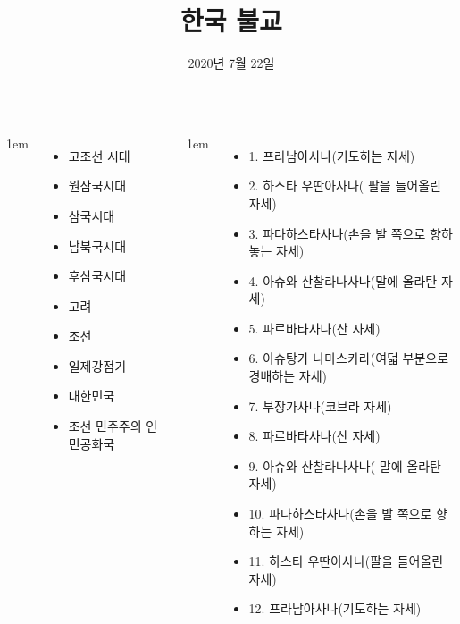 \documentclass[25pt, a1paper ]{tikzposter}
\title{ 한국 불교 }
\author{ 2020년 7월  
				22일 }
\begin{document}
	\maketitle



	\begin{columns}


			{
					\setlength{\leftmargini}{2em}
					\setlength{\labelsep} {1em}
					\begin{itemize}
					\item 고조선 시대
					\item 원삼국시대
					\item 삼국시대
					\item 남북국시대
					\item 후삼국시대
					\item 고려
					\item 조선

					\item 일제강점기

					\item 대한민국
					\item 조선 민주주의 인민공화국
					\end{itemize}
			}


			{
					\setlength{\leftmargini}{2em}
					\setlength{\labelsep} {1em}
					\begin{itemize}
					\item 1. 프라남아사나(기도하는 자세) 
					\item 2. 하스타 우딴아사나( 팔을 들어올린 자세)
					\item 3. 파다하스타사나(손을 발 쪽으로 향하놓는 자세)
					\item 4. 아슈와 산찰라나사나(말에 올라탄 자세)
					\item 5. 파르바타사나(산 자세)
					\item 6. 아슈탕가 나마스카라(여덟 부분으로 경배하는 자세)
					\item 7. 부장가사나(코브라 자세)
					\item 8. 파르바타사나(산 자세)
					\item 9. 아슈와 산찰라나사나( 말에 올라탄 자세)
					\item 10. 파다하스타사나(손을 발 쪽으로 향하는 자세)
					\item 11. 하스타 우딴아사나(팔을 들어올린 자세)
					\item 12. 프라남아사나(기도하는 자세)
					\end{itemize}
			}


\end{columns}
\end{document}
